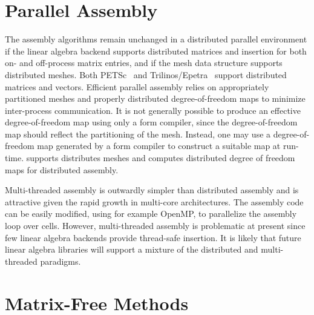 \section{Parallel Assembly}

The assembly algorithms remain unchanged in a distributed parallel
environment if the linear algebra backend supports distributed
matrices and insertion for both on- and off-process matrix entries,
and if the mesh data structure supports distributed meshes. Both
PETSc~\cite{BalayBuschelmanEtAl2001,BalayBuschelmanEtAl2004} and
Trilinos/Epetra~\cite{HerouxBartlettEtAl2005} support distributed
matrices and vectors. Efficient parallel assembly relies on
appropriately partitioned meshes and properly distributed
degree-of-freedom maps to minimize inter-process communication.  It is
not generally possible to produce an effective degree-of-freedom map
using only a form compiler, since the degree-of-freedom map should
reflect the partitioning of the mesh. Instead, one may use a
degree-of-freedom map generated by a form compiler to construct a
suitable map at run-time.
\dolfin{} supports distributes meshes and computes distributed
degree of freedom maps for distributed assembly.

Multi-threaded assembly is outwardly simpler than distributed assembly
and is attractive given the rapid growth in multi-core architectures.
The assembly code can be easily modified, using for example OpenMP,
to parallelize
the assembly loop over cells.  However, multi-threaded assembly is
problematic at present since few linear algebra backends provide
thread-safe insertion. It is likely that future linear algebra
libraries will support a mixture of the distributed and multi-threaded
paradigms.

\section{Matrix-Free Methods}

